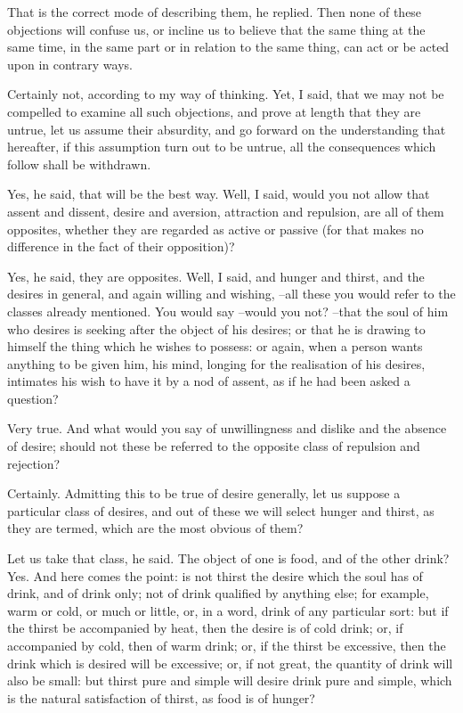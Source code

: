 That is the correct mode of describing them, he replied.
Then none of these objections will confuse us, or incline us to believe that the same thing at the same time, in the same part or in relation to the same thing, can act or be acted upon in contrary ways.

Certainly not, according to my way of thinking.
Yet, I said, that we may not be compelled to examine all such objections, and prove at length that they are untrue, let us assume their absurdity, and go forward on the understanding that hereafter, if this assumption turn out to be untrue, all the consequences which follow shall be withdrawn.

Yes, he said, that will be the best way.
Well, I said, would you not allow that assent and dissent, desire and aversion, attraction and repulsion, are all of them opposites, whether they are regarded as active or passive (for that makes no difference in the fact of their opposition)?

Yes, he said, they are opposites.
Well, I said, and hunger and thirst, and the desires in general, and again willing and wishing, --all these you would refer to the classes already mentioned. You would say --would you not? --that the soul of him who desires is seeking after the object of his desires; or that he is drawing to himself the thing which he wishes to possess: or again, when a person wants anything to be given him, his mind, longing for the realisation of his desires, intimates his wish to have it by a nod of assent, as if he had been asked a question?

Very true.
And what would you say of unwillingness and dislike and the absence of desire; should not these be referred to the opposite class of repulsion and rejection?

Certainly.
Admitting this to be true of desire generally, let us suppose a particular class of desires, and out of these we will select hunger and thirst, as they are termed, which are the most obvious of them?

Let us take that class, he said.
The object of one is food, and of the other drink?
Yes.
And here comes the point: is not thirst the desire which the soul has of drink, and of drink only; not of drink qualified by anything else; for example, warm or cold, or much or little, or, in a word, drink of any particular sort: but if the thirst be accompanied by heat, then the desire is of cold drink; or, if accompanied by cold, then of warm drink; or, if the thirst be excessive, then the drink which is desired will be excessive; or, if not great, the quantity of drink will also be small: but thirst pure and simple will desire drink pure and simple, which is the natural satisfaction of thirst, as food is of hunger?

